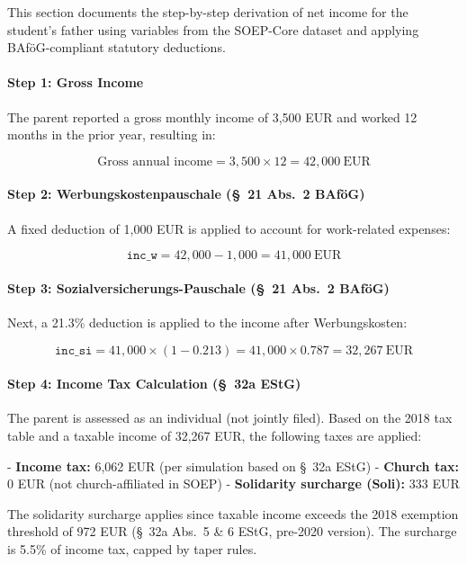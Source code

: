 This section documents the step-by-step derivation of net income for the student's father using variables from the SOEP-Core dataset and applying BAföG-compliant statutory deductions.

\paragraph{Step 1: Gross Income}

The parent reported a gross monthly income of 3,500 EUR and worked 12 months in the prior year, resulting in:

\[
\text{Gross annual income} = 3{,}500 \times 12 = 42{,}000~\text{EUR}
\]

\paragraph{Step 2: Werbungskostenpauschale (§~21 Abs.~2 BAföG)}

A fixed deduction of 1,000 EUR is applied to account for work-related expenses:

\[
\texttt{inc\_w} = 42{,}000 - 1{,}000 = 41{,}000~\text{EUR}
\]

\paragraph{Step 3: Sozialversicherungs-Pauschale (§~21 Abs.~2 BAföG)}

Next, a 21.3\% deduction is applied to the income after Werbungskosten:

\[
\texttt{inc\_si} = 41{,}000 \times (1 - 0.213) = 41{,}000 \times 0.787 = 32{,}267~\text{EUR}
\]

\paragraph{Step 4: Income Tax Calculation (§~32a EStG)}

The parent is assessed as an individual (not jointly filed). Based on the 2018 tax table and a taxable income of 32,267 EUR, the following taxes are applied:

- \textbf{Income tax:} 6,062 EUR (per simulation based on §~32a EStG)
- \textbf{Church tax:} 0 EUR (not church-affiliated in SOEP)
- \textbf{Solidarity surcharge (Soli):} 333 EUR

The solidarity surcharge applies since taxable income exceeds the 2018 exemption threshold of 972 EUR (§~32a Abs.~5 \& 6 EStG, pre-2020 version). The surcharge is 5.5\% of income tax, capped by taper rules.

